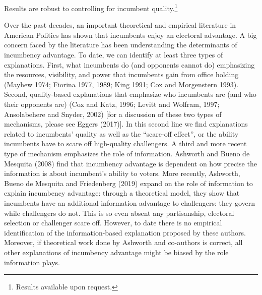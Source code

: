 \documentclass[12pt]{amsart}
\makeatletter
\def\section{\@startsection{section}{1}
	\z@{1.0\linespacing\@plus\linespacing}{.5\linespacing}{\Large}}
\numberwithin{equation}{section}
\theoremstyle{definition}
\theoremstyle{definition}
\theoremstyle{definition}
\makeatother
\begin{document}
\section{Robustness}
      
 Results are robust to controlling for incumbent quality.\footnote{Results available upon request.} 
   


\clearpage

\section{Mechanisms}

Over the past decades, an important theoretical and empirical literature in American Politics has shown that incumbents enjoy an electoral advantage. A big concern faced by the literature has been understanding the determinants of incumbency advantage. To date, we can identify at least three types of explanations.  First, what incumbents do (and opponents cannot do) emphasizing the resources, visibility, and power that incumbents gain from office holding (Mayhew 1974; Fiorina 1977, 1989; King 1991; Cox and Morgenstern 1993). Second, quality-based explanations that emphasize who incumbents are (and who their opponents are) (Cox and Katz, 1996; Levitt and Wolfram, 1997; Ansolabehere and Snyder, 2002) [for a discussion of these two types of mechanisms, please see Eggers (2017)]. In this second line we find explanations related to incumbents’ quality as well as the “scare-off effect”, or the ability incumbents have to scare off high-quality challengers. A third and more recent type of mechanism emphasizes the role of information. Ashworth and Bueno de Mesquita (2008) find that incumbency advantage is dependent on how precise the information is about incumbent’s ability to voters. More recently, Ashworth, Bueno de Mesquita and Friedenberg (2019) expand on the role of information to explain incumbency advantage: through a theoretical model, they show that incumbents have an additional information advantage to challengers: they govern while challengers do not. This is so even absent any partisanship, electoral selection or challenger scare off. However, to date there is no empirical identification of the information-based explanation proposed by these authors. Moreover, if theoretical work done by Ashworth and co-authors is correct, all other explanations of incumbency advantage might be biased by the role information plays. 
\end{document}
